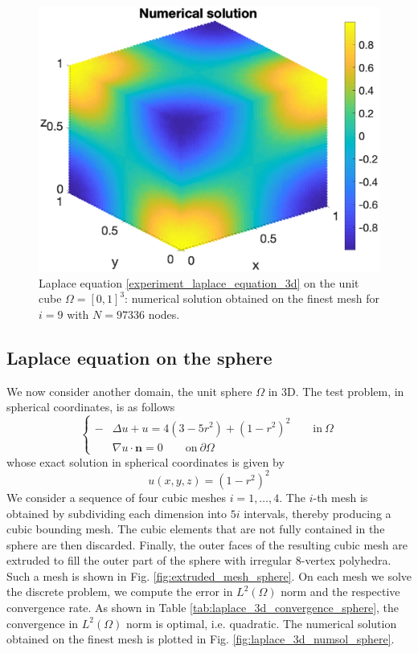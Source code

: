 \documentclass[a4paper]{article}
\begin{document}
\begin{figure}[H]
\begin{center}
\includegraphics[scale=0.5]{laplace3dcube_numsol_Nx46.eps}
\end{center}
\caption{Laplace equation \eqref{experiment_laplace_equation_3d} on the unit cube $\Omega = [0,1]^3$: numerical solution obtained on the finest mesh for $i=9$ with $N= 97336$ nodes.}
\label{fig:laplace_3d_numsol}
\end{figure}

 
\subsection{Laplace equation on the sphere}
\label{sec:laplace_sphere}
We now consider another domain, the unit sphere $\Omega$ in 3D. The test problem, in spherical coordinates, is as follows
\begin{equation}
\label{experiment_laplace_equation_3d_sphere}
\begin{cases}
-&\Delta u + u = 4(3-5r^2) + (1-r^2)^2 \qquad \text{in}\ \Omega\\
&\nabla u \cdot \boldsymbol{n} = 0 \qquad \text{on}\ \partial \Omega
\end{cases}
\end{equation}
whose exact solution in spherical coordinates is given by
\begin{equation}
u(x,y,z) = (1-r^2)^2
\end{equation}
We consider a sequence of four cubic meshes $i=1,\dots,4$. The $i$-th mesh is obtained by subdividing each dimension into $5i$ intervals, thereby producing a cubic bounding mesh.  The cubic elements that are not fully contained in the sphere are then discarded. Finally, the outer faces of the resulting cubic mesh are extruded to fill the outer part of the sphere with irregular $8$-vertex polyhedra.  Such a mesh is shown in Fig.  \ref{fig:extruded_mesh_sphere}. On each mesh we solve the discrete problem,  we compute the error in $L^2(\Omega)$ norm and the respective convergence rate. As shown in Table \ref{tab:laplace_3d_convergence_sphere}, the convergence in $L^2(\Omega)$ norm is optimal, i.e. quadratic. The numerical solution obtained on the finest mesh is plotted in Fig.  \ref{fig:laplace_3d_numsol_sphere}.
\end{document}
